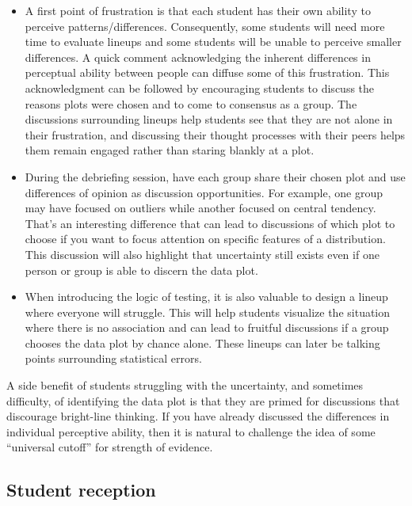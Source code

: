 \documentclass[12pt]{article}
\begin{document}
\begin{itemize}
\item
  A first point of frustration is that each student has their own
  ability to perceive patterns/differences. Consequently, some students
  will need more time to evaluate lineups and some students will be
  unable to perceive smaller differences. A quick comment acknowledging
  the inherent differences in perceptual ability between people can
  diffuse some of this frustration. This acknowledgment can be followed
  by encouraging students to discuss the reasons plots were chosen and
  to come to consensus as a group. The discussions surrounding lineups
  help students see that they are not alone in their frustration, and
  discussing their thought processes with their peers helps them remain
  engaged rather than staring blankly at a plot.
\item
  During the debriefing session, have each group share their chosen plot
  and use differences of opinion as discussion opportunities. For
  example, one group may have focused on outliers while another focused
  on central tendency. That's an interesting difference that can lead to
  discussions of which plot to choose if you want to focus attention on
  specific features of a distribution. This discussion will also
  highlight that uncertainty still exists even if one person or group is
  able to discern the data plot.
\item
  When introducing the logic of testing, it is also valuable to design a
  lineup where everyone will struggle. This will help students visualize
  the situation where there is no association and can lead to fruitful
  discussions if a group chooses the data plot by chance alone. These
  lineups can later be talking points surrounding statistical errors.
\end{itemize}

A side benefit of students struggling with the uncertainty, and
sometimes difficulty, of identifying the data plot is that they are
primed for discussions that discourage bright-line thinking. If you have
already discussed the differences in individual perceptive ability, then
it is natural to challenge the idea of some ``universal cutoff'' for
strength of evidence.

\hypertarget{student-reception}{%
\subsection{Student reception}\label{student-reception}}
\end{document}
